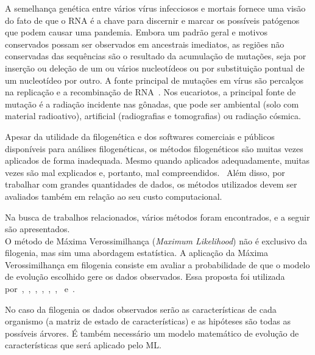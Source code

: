 A semelhança genética entre vários vírus infecciosos e mortais fornece uma visão do fato de que o RNA é a chave para discernir e marcar os possíveis patógenos que podem causar uma pandemia. Embora um padrão geral e motivos conservados possam ser observados em ancestrais imediatos, as regiões não conservadas das sequências são o resultado da acumulação de mutações, seja por inserção ou deleção de um ou vários nucleotídeos ou por substituição pontual de um nucleotídeo por outro. A fonte principal de mutações em vírus são percalços na replicação e a recombinação de RNA~\cite[p. 11]{behl_threat_2022}. Nos eucariotos, a principal fonte de mutação é a radiação incidente nas gônadas, que pode ser ambiental (solo com material radioativo), artificial (radiografias e tomografias) ou radiação cósmica.

Apesar da utilidade da filogenética e dos softwares comerciais e públicos disponíveis para análises filogenéticas, os métodos filogenéticos são muitas vezes aplicados de forma inadequada. Mesmo quando aplicados adequadamente, muitas vezes são mal explicados e, portanto, mal compreendidos.~\cite[p. 1]{barry_phylogenetic_analysis_2006} Além disso, por trabalhar com grandes quantidades de dados, os métodos utilizados devem ser avaliados também em relação ao seu custo computacional.

Na busca de trabalhos relacionados, vários métodos foram encontrados, e a seguir são apresentados.\\
O método de Máxima Verossimilhança (\textit{Maximum Likelihood}) não é exclusivo da filogenia, mas sim uma abordagem estatística. A aplicação da Máxima Verossimilhança em filogenia consiste em avaliar a probabilidade de que o modelo de evolução escolhido gere os dados observados. Essa proposta foi utilizada por~\cite{fall_genetic_diversity_2021},~\cite{behl_threat_2022},~\cite{shabbir_comprehensive_2020},~\cite{hudu_hepatitis_2018},~\cite{sallard_tracing_2021},~\cite{paez-espino_diversity_evolution_2019},~\cite{tang_evolutionary_2021} e~\cite{cho_analysis_2022}.


No caso da filogenia os dados observados serão as características de cada organismo (a matriz de estado de características) e as hipóteses são todas as possíveis árvores. É também necessário um modelo matemático de evolução de características que será aplicado pelo ML.


